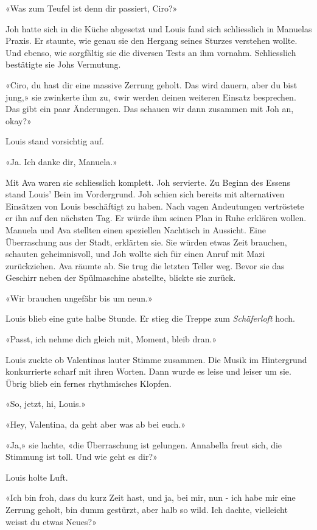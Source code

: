 «Was zum Teufel ist denn dir passiert, Ciro?»

\sectionbreak

Joh hatte sich in die Küche abgesetzt und Louis fand sich schliesslich in
Manuelas Praxis.
Er staunte, wie genau sie den Hergang seines Sturzes verstehen wollte.
Und ebenso, wie sorgfältig sie die diversen Tests an ihm vornahm.
Schliesslich bestätigte sie Johs Vermutung.

«Ciro, du hast dir eine massive Zerrung geholt. Das wird dauern, aber du
bist jung,» sie zwinkerte ihm zu, «wir werden deinen weiteren
Einsatz besprechen. Das gibt ein paar Änderungen. Das schauen wir dann
zusammen mit Joh an, okay?»

Louis stand vorsichtig auf.

«Ja. Ich danke dir, Manuela.»

Mit Ava waren sie schliesslich komplett. Joh servierte. 
Zu Beginn des Essens stand Louis’
Bein im Vordergrund. Joh schien sich bereits mit alternativen Einsätzen
von Louis beschäftigt zu haben. Nach vagen Andeutungen vertröstete er
ihn auf den nächsten Tag. Er würde ihm seinen Plan in Ruhe erklären
wollen.
Manuela und Ava stellten einen speziellen Nachtisch in Aussicht. Eine
Überraschung aus der Stadt, erklärten sie. Sie würden etwas Zeit
brauchen, schauten geheimnisvoll, und Joh wollte sich für einen Anruf
mit Mazi zurückziehen. Ava räumte ab. Sie trug die letzten Teller weg.
Bevor sie das Geschirr neben der Spülmaschine abstellte, blickte sie
zurück.

«Wir brauchen ungefähr bis um neun.»

Louis blieb eine gute halbe Stunde. Er stieg die Treppe zum
\emph{Schäferloft} hoch.

\sectionbreak

«Passt, ich nehme dich gleich mit, Moment, bleib dran.»

Louis zuckte ob Valentinas lauter Stimme zusammen. Die Musik im
Hintergrund konkurrierte scharf mit ihren Worten. Dann wurde es leise 
und leiser um sie. Übrig blieb ein fernes rhythmisches Klopfen.

«So, jetzt, hi, Louis.»

«Hey, Valentina, da geht aber was ab bei euch.»

«Ja,» sie lachte, «die Überraschung ist gelungen. Annabella freut sich,
die Stimmung ist toll. Und wie geht es dir?»

Louis holte Luft.

«Ich bin froh, dass du kurz Zeit hast, und ja, bei mir, nun - ich habe
mir eine Zerrung geholt, bin dumm gestürzt, aber halb so wild. Ich
dachte, vielleicht weisst du etwas Neues?»

